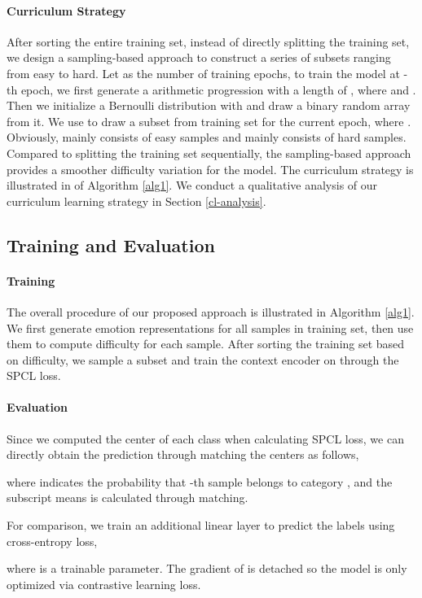 \documentclass[11pt]{article}
\begin{document}
\paragraph{Curriculum Strategy} After sorting the entire training set, instead of directly splitting the training set, we design a sampling-based approach to construct a series of subsets ranging from easy to hard. Let  as the number of training epochs, to train the model at -th epoch, we first generate a arithmetic progression  with a length of , where  and . Then we initialize a Bernoulli distribution with  and draw a binary random array  from it.
We use  to draw a subset  from training set for the current epoch, where .
Obviously,  mainly consists of easy samples and  mainly consists of hard samples. Compared to splitting the training set sequentially, the sampling-based approach provides a smoother difficulty variation for the model. The curriculum strategy is illustrated in   of Algorithm \ref{alg1}. We conduct a qualitative analysis of our curriculum learning strategy in Section \ref{cl-analysis}.
\subsection{Training and Evaluation}
\paragraph{Training} The overall procedure of our proposed approach is illustrated in Algorithm \ref{alg1}. We first generate emotion representations for all samples in training set, then use them to compute difficulty for each sample. After sorting the training set based on difficulty, we sample a subset  and train the context encoder on  through the SPCL loss.
\paragraph{Evaluation}  Since we computed the center of each class  when calculating SPCL loss, we can directly obtain the prediction through matching the centers as follows,

where  indicates the probability that -th sample belongs to category , and the subscript  means  is calculated through matching.


For comparison, we train an additional linear layer to predict the labels using cross-entropy loss,


where  is a trainable parameter. The gradient of  is detached so the model is only optimized via contrastive learning loss. 
\end{document}
